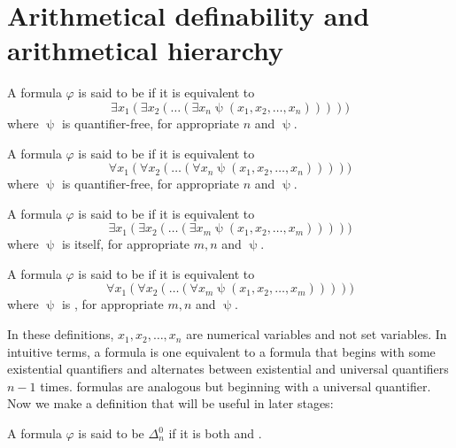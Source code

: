 \documentclass[../main.tex]{memoir}
\begin{document}
\section{Arithmetical definability and arithmetical hierarchy}

\begin{definition}
  A formula $\varphi$ is said to be \re if it is equivalent to
  \[
    \exists x_1 (\exists x_2 (\ldots (\exists x_n \uppsi(x_1, x_2, \ldots, x_n)))))
  \]
  where $\uppsi$ is quantifier-free, for appropriate $n$ and $\uppsi$.
\end{definition}

\begin{definition}
  A formula $\varphi$ is said to be \core if it is equivalent to
  \[
    \forall x_1 (\forall x_2 (\ldots (\forall x_n \uppsi(x_1, x_2, \ldots, x_n)))))
  \]
  where $\uppsi$ is quantifier-free, for appropriate $n$ and $\uppsi$.
\end{definition}

\begin{definition}
  A formula $\varphi$ is said to be  if it is equivalent to
  \[
    \exists x_1 (\exists x_2 (\ldots (\exists x_m \uppsi(x_1, x_2, \ldots, x_m)))))
  \]
  where $\uppsi$ is  itself, for appropriate $m, n$ and $\uppsi$.
\end{definition}

\begin{definition}
  A formula $\varphi$ is said to be  if it is equivalent to
  \[
    \forall x_1 (\forall x_2 (\ldots (\forall x_m \uppsi(x_1, x_2, \ldots, x_m)))))
  \]
  where $\uppsi$ is , for appropriate $m, n$ and $\uppsi$.
\end{definition}

In these definitions, $x_1, x_2, \ldots, x_n$ are numerical variables and not set variables. In intuitive terms, a  formula is one equivalent to a formula that begins with some existential quantifiers and alternates between existential and universal quantifiers $n - 1$ times.  formulas are analogous but beginning with a universal quantifier. Now we make a definition that will be useful in later stages:

\begin{definition}
  A formula $\varphi$ is said to be $\Delta_{n}^{0}$ if it is both  and .
\end{definition}
\end{document}
